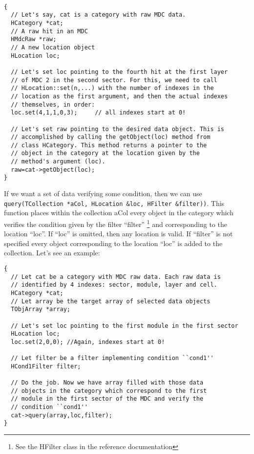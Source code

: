 \begin{lstlisting}

{
  // Let's say, cat is a category with raw MDC data.
  HCategory *cat;
  // A raw hit in an MDC
  HMdcRaw *raw;
  // A new location object
  HLocation loc;

  // Let's set loc pointing to the fourth hit at the first layer 
  // of MDC 2 in the second sector. For this, we need to call
  // HLocation::set(n,...) with the number of indexes in the
  // location as the first argument, and then the actual indexes
  // themselves, in order:
  loc.set(4,1,1,0,3);     // all indexes start at 0!

  // Let's set raw pointing to the desired data object. This is
  // accomplished by calling the getObject(loc) method from
  // class HCategory. This method returns a pointer to the
  // object in the category at the location given by the
  // method's argument (loc).
  raw=cat->getObject(loc);
}
\end{lstlisting}


If we want a set of data verifying some condition, then we can use 
\newline 
\verb+query(TCollection *aCol, HLocation &loc, HFilter &filter))+. 
This function places within the collection aCol every object in 
the category which verifies the condition given by the filter 
``filter'' \footnote{See the HFilter class in the reference 
documentation} and corresponding to the location ``loc''. If ``loc'' 
is omitted, then any location is valid. If ``filter'' is not 
specified every object corresponding to the location ``loc'' is 
added to the collection. Let's see an example:

\begin{lstlisting}
{
  // Let cat be a category with MDC raw data. Each raw data is 
  // identified by 4 indexes: sector, module, layer and cell.
  HCategory *cat;
  // Let array be the target array of selected data objects
  TObjArray *array;

  // Let's set loc pointing to the first module in the first sector
  HLocation loc;
  loc.set(2,0,0); //Again, indexes start at 0!

  // Let filter be a filter implementing condition ``cond1''
  HCond1Filter filter;

  // Do the job. Now we have array filled with those data 
  // objects in the category which correspond to the first 
  // module in the first sector of the MDC and verify the 
  // condition ``cond1''
  cat->query(array,loc,filter);
}
\end{lstlisting}

